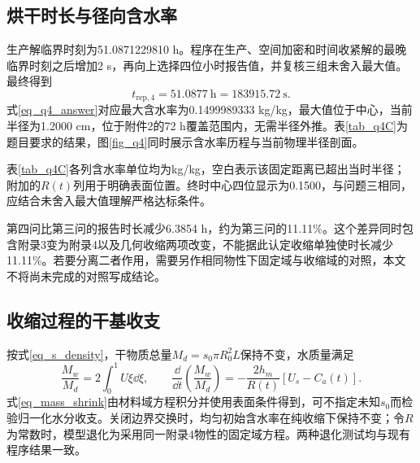 \subsection{烘干时长与径向含水率}
生产解临界时刻为51.0871229810 h。程序在生产、空间加密和时间收紧解的最晚临界时刻之后增加2 s，再向上选择四位小时报告值，并复核三组未舍入最大值。最终得到
\begin{equation}\label{eq_q4_answer}
\boxed{t_{\mathrm{rep},4}=51.0877\ \mathrm h=183915.72\ \mathrm s.}
\end{equation}
式\eqref{eq_q4_answer}对应最大含水率为0.1499989333 kg/kg，最大值位于中心，当前半径为1.2000 cm，位于附件2的72 h覆盖范围内，无需半径外推。表\ref{tab_q4C}为题目要求的结果，图\ref{fig_q4}同时展示含水率历程与当前物理半径剖面。


表\ref{tab_q4C}各列含水率单位均为kg/kg，空白表示该固定距离已超出当时半径；附加的$R(t)$列用于明确表面位置。终时中心四位显示为0.1500，与问题三相同，应结合未舍入最大值理解严格达标条件。

第四问比第三问的报告时长减少6.3854 h，约为第三问的11.11\%。这个差异同时包含附录3变为附录4以及几何收缩两项改变，不能据此认定收缩单独使时长减少11.11\%。若要分离二者作用，需要另作相同物性下固定域与收缩域的对照，本文不将尚未完成的对照写成结论。

\subsection{收缩过程的干基收支}
按式\eqref{eq_s_density}，干物质总量$M_d=s_0\pi R_0^2L$保持不变，水质量满足
\begin{equation}\label{eq_mass_shrink}
\frac{M_w}{M_d}=2\int_0^1U\xi\dd\xi,\qquad
\frac{\dd}{\dd t}\left(\frac{M_w}{M_d}\right)
=-\frac{2h_m}{R(t)}[U_s-C_a(t)].
\end{equation}
式\eqref{eq_mass_shrink}由材料域方程积分并使用表面条件得到，可不指定未知$s_0$而检验归一化水分收支。关闭边界交换时，均匀初始含水率在纯收缩下保持不变；令$R$为常数时，模型退化为采用同一附录4物性的固定域方程。两种退化测试均与现有程序结果一致。
\FloatBarrier
